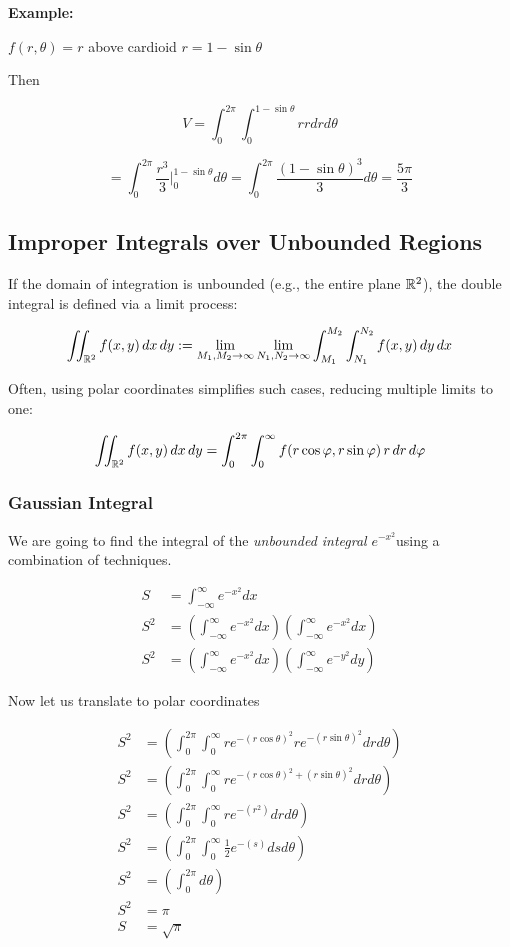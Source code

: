 \textbf{Example:}
\vspace{\baselineskip}

\(f(r, \theta) = r\) above cardioid \(r = 1 - \sin \theta\)

Then

\[
    V = \int_{0}^{2\pi}\int_{0}^{1 - \sin \theta} r r dr d\theta
\]

\[
    = \int_{0}^{2\pi}\frac{r^3}{3} |_{0}^{1 - \sin \theta} d\theta = \int_{0}^{2\pi} \frac{{(1 - \sin\theta)}^3}{3} d\theta = \frac{5 \pi}{3}
\]


\subsection{Improper Integrals over Unbounded Regions}

If the domain of integration is unbounded (e.g., the entire plane \( \mathbb{R}^2 \)), the double integral is defined via a limit process:

\[
    \iint_{\mathbb{R}^2} f(x, y)\, dx\, dy := \lim_{M_1, M_2 \to \infty} \lim_{N_1, N_2 \to \infty}
    \int_{M_1}^{M_2} \int_{N_1}^{N_2} f(x, y)\, dy\, dx
\]

Often, using polar coordinates simplifies such cases, reducing multiple limits to one:

\[
    \iint_{\mathbb{R}^2} f(x, y)\, dx\, dy = \int_0^{2\pi} \int_0^{\infty} f(r \cos \varphi, r \sin \varphi)\, r\, dr\, d\varphi
\]


\subsubsection{Gaussian Integral}

We are going to find the integral of the \emph{unbounded integral} 
\(e^{-x^2}\)using a combination of techniques.

\begin{align*}
    S &= \int_{-\infty}^{\infty} e^{-x^2}dx\\
    S^2 &= \left(\int_{-\infty}^{\infty} e^{-x^2}dx\right) \left(\int_{-\infty}^{\infty} e^{-x^2}dx\right)\\
    S^2 &= \left(\int_{-\infty}^{\infty} e^{-x^2}dx\right) \left(\int_{-\infty}^{\infty} e^{-y^2}dy\right)
\end{align*}

Now let us translate to polar coordinates

\begin{align*}
    S^2 &= \left(\int_{0}^{2\pi} \int_{0}^{\infty}re^{-{(r\cos\theta)}^2} re^{-{(r\sin\theta)}^2}drd\theta\right)\\
    S^2 &= \left(\int_{0}^{2\pi} \int_{0}^{\infty}re^{-{(r\cos\theta)}^2 + {(r\sin\theta)}^2}drd\theta\right)\\
    S^2 &= \left(\int_{0}^{2\pi} \int_{0}^{\infty}re^{-(r^2)}drd\theta\right)\\
    S^2 &=  \left(\int_{0}^{2\pi} \int_{0}^{\infty}\frac{1}{2}e^{-(s)}dsd\theta\right)\\
    S^2 &= \left(\int_{0}^{2\pi}d\theta\right)\\
    S^2 &= \pi\\
    S   &= \sqrt{\pi}
\end{align*}

